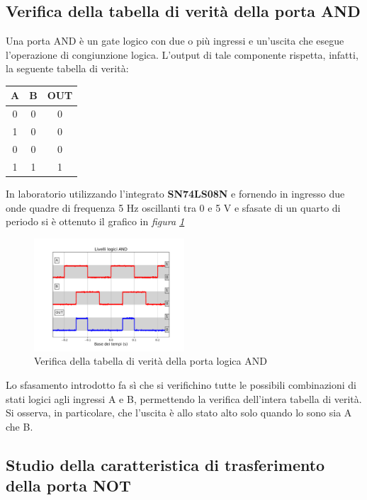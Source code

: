 \documentclass[journal]{IEEEtran}
\begin{document}
\subsection{Verifica della tabella di verità della porta AND}
Una porta AND è un gate logico con due o più ingressi e un'uscita che esegue l'operazione di congiunzione logica. L'output di tale componente rispetta, infatti, la seguente tabella di verità:
\begin{center}
\begin{tabular}{ |c|c|c| } 
 \hline
 \rowcolor{lightgray}
 A & B & OUT \\ \hline \hline
 0 & 0 & 0 \\ \hline
 1 & 0 & 0 \\ \hline
 0 & 0 & 0 \\ \hline
 1 & 1 & 1 \\ \hline
 
 \hline
\end{tabular}
\end{center}
In laboratorio utilizzando l'integrato \textbf{SN74LS08N} e fornendo in ingresso due onde quadre di frequenza 5 Hz oscillanti tra 0 e 5 V e sfasate di un quarto di periodo si è ottenuto il grafico in  \textit{figura \ref{fig:AND-table}} 
\begin{figure}[H]%
\begin{center}
\includegraphics[width=0.50\textwidth]{analysis/output/AND-all.pdf}
\caption{Verifica della tabella di verità della porta logica AND}
\label{fig:AND-table}
\end{center}
\end{figure}

Lo sfasamento introdotto fa sì che si verifichino tutte le possibili combinazioni di stati logici agli ingressi A e B, permettendo la verifica dell'intera tabella di verità. Si osserva, in particolare, che l'uscita è allo stato alto solo quando lo sono sia A che B.


\subsection{Studio della caratteristica di trasferimento della porta NOT}
\end{document}
